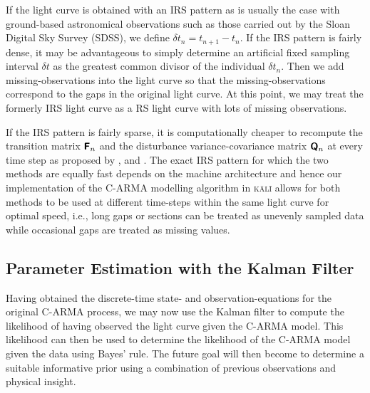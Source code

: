 \documentclass[a4paper,fleqn,usenatbib]{mnras}
\begin{document}
If the light curve is obtained with an IRS pattern as is usually the case with ground-based astronomical observations such as those carried out by the Sloan Digital Sky Survey (SDSS), we define $\delta t_{n} = t_{n+1} - t_{n}$. If the IRS pattern is fairly dense, it may be advantageous to simply determine an artificial fixed sampling interval $\delta t$ as the greatest common divisor of the individual $\delta t_{n}$. Then we add missing-observations into the light curve so that the missing-observations correspond to the gaps in the original light curve. At this point, we may treat the formerly IRS light curve as a RS light curve with lots of missing observations.

If the IRS pattern is fairly sparse, it is computationally cheaper to recompute the transition matrix $\textbf{\textsf{F}}_{n}$ and the disturbance variance-covariance matrix $\textbf{\textsf{Q}}_{n}$ at every time step as proposed by \cite{JonesAckerson90}, \cite{Jones} and \cite{Kelly14}. The exact IRS pattern for which the two methods are equally fast depends on the machine architecture and hence our implementation of the C-ARMA modelling algorithm in \textsc{k\={a}l\={i}} allows for both methods to be used at different time-steps within the same light curve for optimal speed, i.e., long gaps or sections can be treated as unevenly sampled data while occasional gaps are treated as missing values.

\subsection[Parameter Estimation]{Parameter Estimation with the Kalman Filter}\label{sec:Kalman}

Having obtained the discrete-time state- and observation-equations for the original C-ARMA process, we may now use the Kalman filter to compute the likelihood of having observed the light curve given the C-ARMA model. This likelihood can then be used to determine the likelihood of the C-ARMA model given the data using Bayes' rule. The future goal will then become to determine a suitable informative prior using a combination of previous observations and physical insight.
\end{document}
